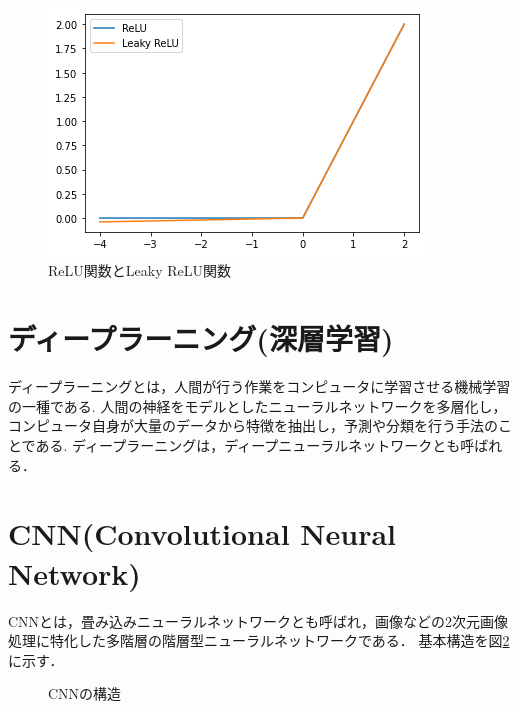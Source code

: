 \documentclass[a4j,12pt,dvipdfmx]{jreport}
\begin{document}
\begin{figure}[t]
  \centering
  \includegraphics[width=10cm]{image/relu.png}
  \caption{ReLU関数とLeaky ReLU関数}
  \label{fig:relu}
\end{figure}

\section{ディープラーニング(深層学習)}
ディープラーニングとは，人間が行う作業をコンピュータに学習させる機械学習の一種である.
人間の神経をモデルとしたニューラルネットワークを多層化し，コンピュータ自身が大量のデータから特徴を抽出し，予測や分類を行う手法のことである.
ディープラーニングは，ディープニューラルネットワークとも呼ばれる．

\section{CNN(Convolutional Neural Network)}
CNNとは，畳み込みニューラルネットワークとも呼ばれ，画像などの2次元画像処理に特化した多階層の階層型ニューラルネットワークである\cite{cnn}． 
基本構造を図\ref{fig:cnn}に示す．

\begin{figure}[b]
  \centering
  \caption{CNNの構造}
  \label{fig:cnn}
\end{figure}
\end{document}
